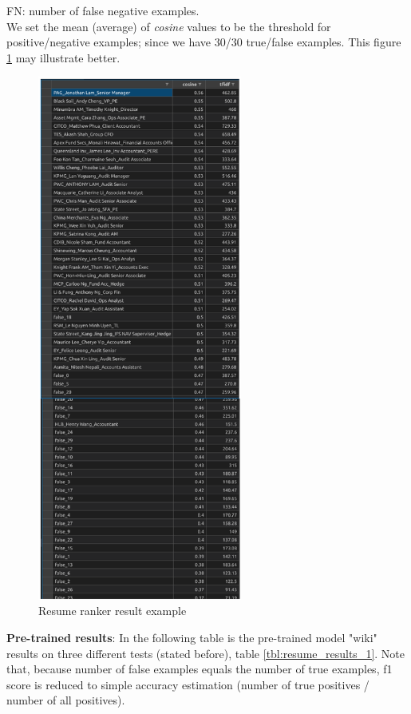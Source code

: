 FN: number of false negative examples.\\

We set the mean (average) of \textit{cosine} values to be the threshold for positive/negative examples; since we have 30/30 true/false examples. This figure \ref{fig:resume_results_1} may illustrate better.\\

\begin{figure}[h!]
\centering
\includegraphics[width=0.6\textwidth]{images/resume_results_1.png}
\caption{Resume ranker result example}
\label{fig:resume_results_1}
\end{figure}

\textbf{Pre-trained results}: In the following table is the pre-trained model "wiki" results on three different tests (stated before), table \ref{tbl:resume_results_1}. Note that, because number of false examples equals the number of true examples, f1 score is reduced to simple accuracy estimation (number of true positives / number of all positives).\\


